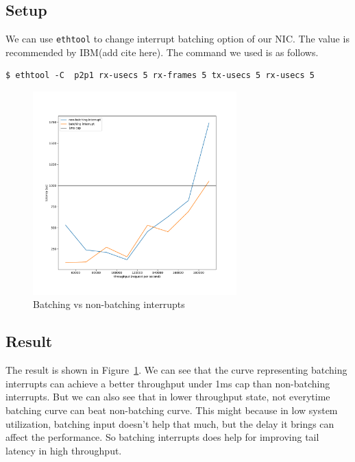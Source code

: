 \documentclass[bsc,frontabs,twoside,singlespacing,parskip,deptreport]{infthesis}     %
\begin{document}
\subsection{Setup}
We can use \texttt{ethtool} to change interrupt batching option of our NIC. The value is recommended by IBM(add cite here). The command we used is as follows.

\begin{verbatim}
$ ethtool -C  p2p1 rx-usecs 5 rx-frames 5 tx-usecs 5 rx-usecs 5
\end{verbatim}

\begin{figure}[h]
	\centering
	\includegraphics[width=0.7\textwidth,height=0.7\textheight,keepaspectratio]{figure/batching.pdf}
	\caption{Batching vs non-batching interrupts}
	\label{fig:batching}
\end{figure}


\subsection{Result}
The result is shown in Figure~\ref{fig:batching}. We can see that the curve representing batching interrupts can achieve a better throughput under 1ms cap than non-batching interrupts. But we can also see that in lower throughput state, not everytime batching curve can beat non-batching curve. This might because in low system utilization, batching input doesn't help that much, but the delay it brings can affect the performance. So batching interrupts does help for improving tail latency in high throughput.
\end{document}
